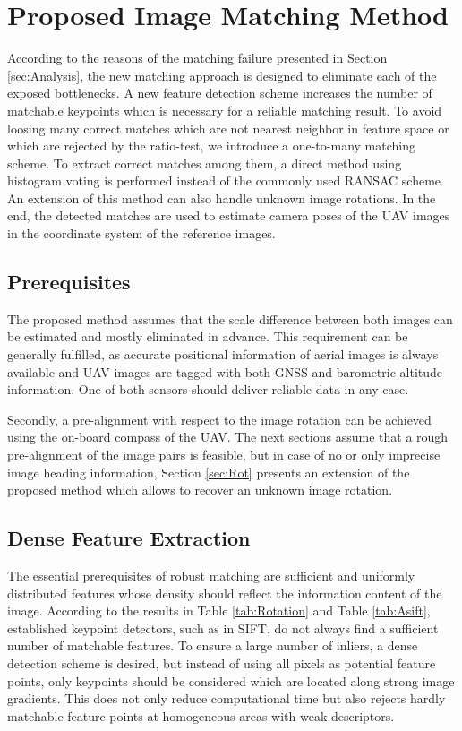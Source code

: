 \section{Proposed Image Matching Method}
\label{sec:method}
According to the reasons of the matching failure presented in Section \ref{sec:Analysis}, the new matching approach is designed to eliminate each of the exposed bottlenecks.
A new feature detection scheme increases the number of matchable keypoints which is necessary for a reliable matching result.
To avoid loosing many correct matches which are not nearest neighbor in feature space or which are rejected by the ratio-test, we introduce a one-to-many matching scheme. 
To extract correct matches among them, a direct method using histogram voting is performed instead of the commonly used RANSAC scheme.
An extension of this method can also handle unknown image rotations.
In the end, the detected matches are used to estimate camera poses of the UAV images in the coordinate system of the reference images. 

\subsection{Prerequisites}
The proposed method assumes that the scale difference between both images can be estimated and mostly eliminated in advance.
This requirement can be generally fulfilled, as accurate positional information of aerial images is always available and UAV images are tagged with both GNSS and barometric altitude information.
One of both sensors should deliver reliable data in any case.

Secondly, a pre-alignment with respect to the image rotation can be achieved using the on-board compass of the UAV.
The next sections assume that a rough pre-alignment of the image pairs is feasible, but in case of no or only imprecise image heading information, Section \ref{sec:Rot} presents an extension of the proposed method which allows to recover an unknown image rotation.

\subsection{Dense Feature Extraction}\label{sec:FeatExt}
The essential prerequisites of robust matching are sufficient and uniformly distributed features whose density should reflect the information content of the image.
According to the results in Table \ref{tab:Rotation} and Table \ref{tab:Asift}, established keypoint detectors, such as in SIFT, do not always find a sufficient number of matchable features.
To ensure a large number of inliers, a dense detection scheme is desired, but instead of using all pixels as potential feature points, only keypoints should be considered which are located along strong image gradients.
This does not only reduce computational time but also rejects hardly matchable feature points at homogeneous areas with weak descriptors.

